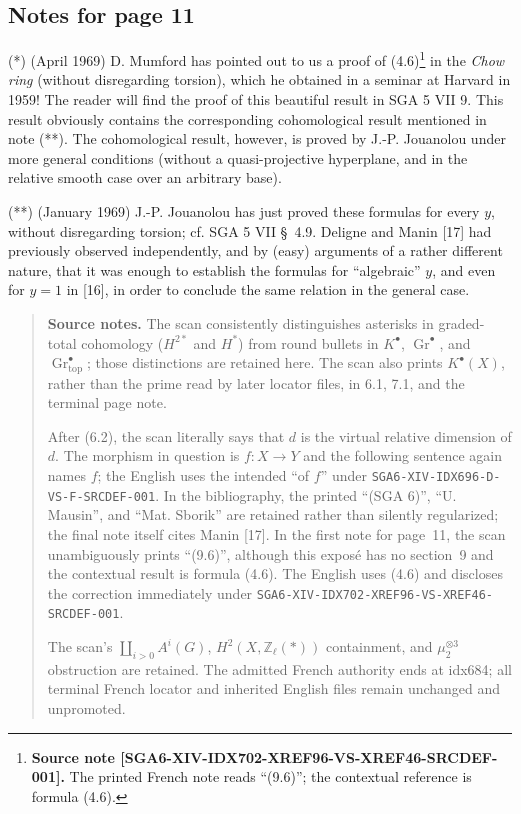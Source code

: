 \documentclass[11pt]{article}
\newcommand{\Zell}{\mathbb Z_{\ell}}
\newcommand{\Gtop}{\operatorname{Gr}_{\mathrm{top}}}
\begin{document}
\subsection*{Notes for page 11}

\noindent(*) (April 1969) D. Mumford has pointed out to us a proof of
(4.6)\footnote{\textbf{Source note
[SGA6-XIV-IDX702-XREF96-VS-XREF46-SRCDEF-001].} The printed French note
reads ``(9.6)''; the contextual reference is formula (4.6).}
in the \emph{Chow ring} (without disregarding torsion), which he obtained in
a seminar at Harvard in 1959! The reader will find the proof of this
beautiful result in SGA 5 VII 9. This result obviously contains the
corresponding cohomological result mentioned in note (**). The cohomological
result, however, is proved by J.-P. Jouanolou under more general conditions
(without a quasi-projective hyperplane, and in the relative smooth case over
an arbitrary base).

\medskip

\noindent(**) (January 1969) J.-P. Jouanolou has just proved these formulas
for every $y$, without disregarding torsion; cf. SGA 5 VII \S~4.9. Deligne
and Manin [17] had previously observed independently, and by (easy)
arguments of a rather different nature, that it was enough to establish the
formulas for ``algebraic'' $y$, and even for $y=1$ in [16], in order to
conclude the same relation in the general case.

\begin{quote}\footnotesize\raggedright
\textbf{Source notes.}
The scan consistently distinguishes asterisks in graded-total cohomology
($H^{2*}$ and $H^*$) from round bullets in $K^\bullet$,
$\operatorname{Gr}^\bullet$, and $\Gtop^\bullet$; those distinctions are
retained here. The scan also prints $K^\bullet(X)$, rather than the prime
read by later locator files, in 6.1, 7.1, and the terminal page note.

After (6.2), the scan literally says that $d$ is the virtual relative
dimension of $d$. The morphism in question is $f:X\to Y$ and the following
sentence again names $f$; the English uses the intended ``of $f$'' under
\nolinkurl{SGA6-XIV-IDX696-D-VS-F-SRCDEF-001}. In the bibliography, the
printed ``(SGA 6)'', ``U. Mausin'', and ``Mat. Sborik'' are retained rather
than silently regularized; the final note itself cites Manin [17]. In the
first note for page~11, the scan unambiguously prints ``(9.6)'', although
this expos\'e has no section~9 and the contextual result is formula (4.6).
The English uses (4.6) and discloses the correction immediately under
\nolinkurl{SGA6-XIV-IDX702-XREF96-VS-XREF46-SRCDEF-001}.

The scan's $\coprod_{i>0}A^i(G)$, $H^2(X,\Zell(*))$ containment, and
$\mu_2^{\otimes3}$ obstruction are retained. The admitted French authority
ends at idx684; all terminal French locator and inherited English files
remain unchanged and unpromoted.
\end{quote}
\end{document}
